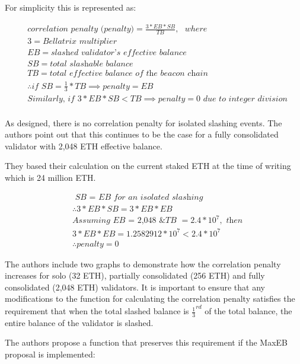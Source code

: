 \documentclass{article}
\begin{document}
For simplicity this is represented as:

\begin{equation*}
\begin{split}
& \textit{correlation penalty (penalty)} = \frac{3*EB*SB}{TB}, \texttt{ } where \\
& 3 = \textit{Bellatrix multiplier} \\
& EB = \textit{slashed validator's effective balance} \\
& SB = \textit{total slashable balance} \\
& TB = \textit{total effective balance of the beacon chain} \\
& \therefore \textit{if SB} = \frac{1}{3} * TB \implies penalty = EB \\
& \textit{Similarly, if } 3*EB*SB <  TB \implies penalty = 0 \textit{ due to integer division} \\
\end{split}
\end{equation*}

As designed, there is no correlation penalty for isolated slashing events. The
authors point out that this continues to be the case for a fully consolidated
validator with 2,048 ETH effective balance.

They based their calculation on the current staked ETH at the time of writing
which is 24 million ETH.

\begin{equation*}
\begin{split}
& \textit{ SB = EB for an isolated slashing} \\
& \therefore  3*EB*SB =  3*EB*EB \\
& \textit{Assuming EB = 2,048 \& TB } = 2.4 * 10^7, \textit{ then} \\
& 3*EB*EB = 1.2582912 * 10^7 < 2.4 * 10^7 \\
& \therefore penalty = 0
\end{split}
\end{equation*}

The authors include two graphs to demonstrate how the correlation penalty
increases for solo (32 ETH), partially consolidated (256 ETH) and fully
consolidated (2,048 ETH) validators. It is important to ensure that any
modifications to the function for calculating the correlation penalty satisfies
the requirement that when the total slashed balance is $\frac{1}{3}^{rd}$ of
the total balance, the entire balance of the validator is slashed.

The authors propose a function that preserves this requirement if the MaxEB
proposal is implemented:
\end{document}
